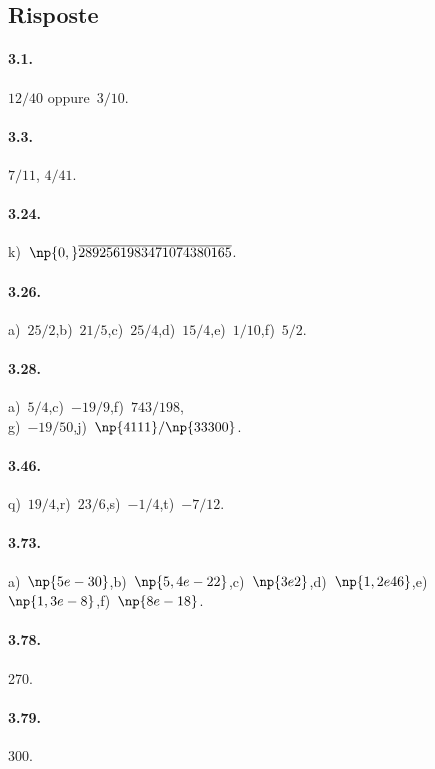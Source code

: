 \subsection{Risposte}
\begin{multicols}{2}
\paragraph{3.1.}$12/40$ oppure~$3/10$.

\paragraph{3.3.} $7/11$, $4/41$.

\paragraph{3.24.} k)~$\np{0,}\overline{2892561983471074380165}$.

\paragraph{3.26.} a)~$25/2$,\quad b)~$21/5$,\quad c)~$25/4$,\quad d)~$15/4$,\quad e)~$1/10$,\quad f)~$5/2$.

\paragraph{3.28.} a)~$5/4$,\quad c)~$-19/9$,\quad f)~$743/198$,\protect\\g)~$-19/50$,\quad j)~$\np{4111}/\np{33300}$.

\paragraph{3.46.} q)~$19/4$,\quad r)~$23/6$,\quad s)~$-1/4$,\quad t)~$-7/12$.

\paragraph{3.73.} a)~$\np{5e-30}$,\quad b)~$\np{5,4e-22}$,\quad c)~$\np{3e2}$,\quad d)~$\np{1,2e46}$,\quad e)~$\np{1,3e-8}$,\quad f)~$\np{8e-18}$.

\paragraph{3.78.} 270.

\paragraph{3.79.} 300.


\end{multicols}
